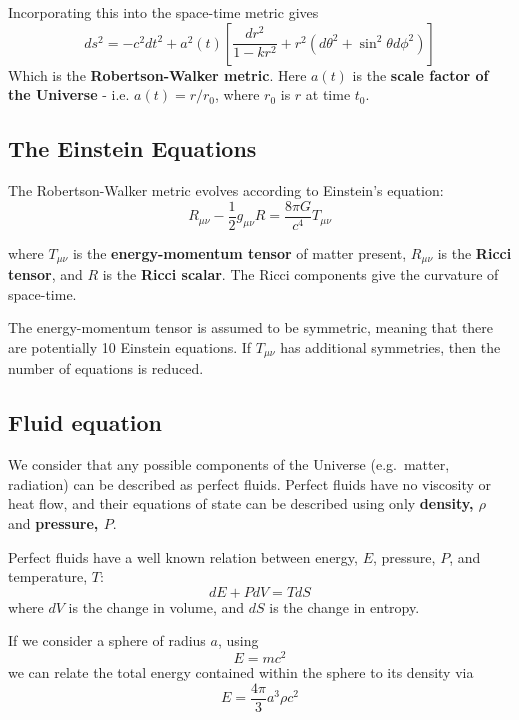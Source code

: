 \documentclass[11pt,a4paper,notoc]{tufte-handout}
\begin{document}
Incorporating this into the space-time metric gives
\begin{equation}
ds^2 = -c^2 dt^2 + a^2(t) \left[\dfrac{dr^2}{1 - kr^2} + r^2\left(d\theta^2 + \sin^2\theta d\phi^2\right)\right]
\label{eq:rw-metric}
\end{equation}
Which is the \textbf{Robertson-Walker metric}. Here \(a(t)\) is the \textbf{scale
factor of the Universe} - i.e. \(a(t) = r/r_0\), where \(r_0\) is \(r\) at
time \(t_0\).

\hypertarget{sec:einstein_eqs}{%
\subsection{The Einstein Equations}\label{sec:einstein_eqs}}

The Robertson-Walker metric evolves according to Einstein's equation:
\begin{equation}
R_{\mu\nu} - \dfrac{1}{2}g_{\mu\nu}R = \dfrac{8\pi G}{c^4} T_{\mu\nu}
\label{eq:einstein}
\end{equation}

where \({T_{\mu\nu}}\) is the \textbf{energy-momentum tensor} of matter
present, \({R_{\mu\nu}}\) is the \textbf{Ricci tensor}, and \({R}\)
is the \textbf{Ricci scalar}. The Ricci components give the curvature of
space-time.

The energy-momentum tensor is assumed to be symmetric, meaning that
there are potentially 10 Einstein equations. If \(T_{\mu\nu}\) has
additional symmetries, then the number of equations is reduced.

\hypertarget{sec:fluid_eqns}{%
\subsection{Fluid equation}\label{sec:fluid_eqns}}

We consider that any possible components of the Universe (e.g.~matter,
radiation) can be described as perfect fluids. Perfect fluids have no
viscosity or heat flow, and their equations of state can be described
using only \textbf{density, \(\rho\)} and \textbf{pressure, \(P\)}.

Perfect fluids have a well known relation between energy, \(E\), pressure,
\(P\), and temperature, \(T\):
\begin{equation}
dE + PdV = TdS
\label{eq:de}
\end{equation}
where \(dV\) is the change in volume, and \(dS\) is the
change in entropy.

If we consider a sphere of radius \(a\), using
\begin{equation}
E = mc^2
\label{eq:emc2}
\end{equation}
we can relate
the total energy contained within the sphere to its density via
\begin{equation}
E = \dfrac{4\pi}{3}a^3\rho c^2
\label{eq:e-rho}
\end{equation}
\end{document}

